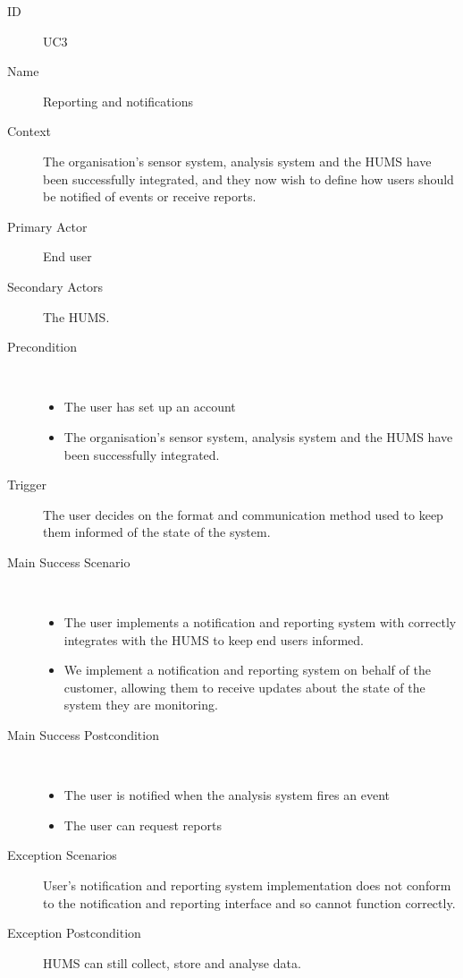 \documentclass[10pt,a4paper]{article}
\begin{document}
\begin{description}
	\item[ID] UC3
	\item[Name] Reporting and notifications
	\item[Context] The organisation's sensor system, analysis system and the HUMS
	               have been successfully integrated, and they now wish to define
	               how users should be notified of events or receive reports.
	\item[Primary Actor] End user
	\item[Secondary Actors] The HUMS.
	\item[Precondition] ~
			\begin{itemize}
			\item The user has set up an account
			\item The organisation's sensor system, analysis system and the HUMS have
			      been successfully integrated.
			\end{itemize}
	\item[Trigger] The user decides on the format and communication method used
	               to keep them informed of the state of the system.
	\item[Main Success Scenario] ~
			\begin{itemize}
				\item The user implements a notification and reporting system with
				      correctly integrates with the HUMS to keep end users informed.
				\item We implement a notification and reporting system on behalf of the
				      customer, allowing them to receive updates about the state of the
				      system they are monitoring.
			\end{itemize}
	\item[Main Success Postcondition] ~
			\begin{itemize}
				\item The user is notified when the analysis system fires an event
				\item The user can request reports
			\end{itemize}
	\item[Exception Scenarios] User's notification and reporting system
			implementation does not conform to the notification and reporting
			interface and so cannot function correctly.
	\item[Exception Postcondition] HUMS can still collect, store and analyse data.
\end{description}
\end{document}
